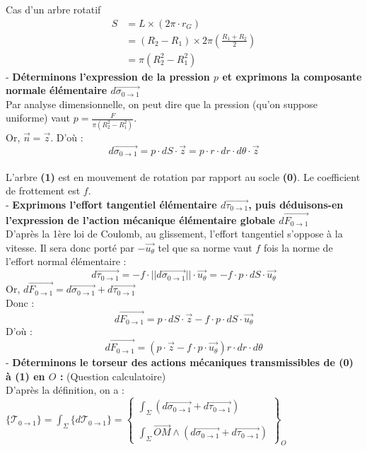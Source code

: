 \documentclass{article} %
\begin{document}
{\begin{exemple}{Cas d'un arbre rotatif}
\begin{align*}
S &= L \times (2\pi \cdot r_G)\\
&= (R_2 - R_1) \times 2\pi \left(\frac{R_1 + R_2}{2}\right)\\
&= \pi(R_2^2 - R_1^2)
\end{align*}
- \textbf{Déterminons l'expression de la pression $p$ et exprimons la composante normale élémentaire  $d\overrightarrow{\sigma_{0\to 1}}$}\\
Par analyse dimensionnelle, on peut dire que la pression (qu'on suppose uniforme) vaut $p = \frac{F}{\pi(R_2^2 - R_1^2)}$.\\
Or, $\vec{n} = \vec{z}$. D'où :
$$d\overrightarrow{\sigma_{0\to 1}} = p \cdot dS \cdot \vec{z} = p \cdot r \cdot dr \cdot d\theta \cdot \vec{z}$$\\
L'arbre \textbf{(1)} est en mouvement de rotation par rapport au socle \textbf{(0)}. Le coefficient de frottement est $f$.\\
- \textbf{Exprimons l'effort tangentiel élémentaire $d\overrightarrow{\tau_{0\to 1}}$, puis déduisons-en l'expression de l'action mécanique élémentaire globale $d\overrightarrow{F_{0\to 1}}$}\\
D'après la 1ère loi de Coulomb, au glissement, l'effort tangentiel s'oppose à la vitesse. Il sera donc porté par $-\overrightarrow{u_\theta}$ tel que sa norme vaut $f$ fois la norme de l'effort normal élémentaire :
$$d\overrightarrow{\tau_{0\to 1}} = - f \cdot ||d\overrightarrow{\sigma_{0\to 1}}|| \cdot \vec{u_\theta} = - f \cdot p \cdot dS \cdot \vec{u_\theta}$$
Or, $d\overrightarrow{F_{0\to 1}} = d\overrightarrow{\sigma_{0\to 1}} + d\overrightarrow{\tau_{0\to 1}}$\\
Donc : 
$$d\overrightarrow{F_{0\to 1}} = p \cdot dS \cdot \vec{z} - f \cdot p \cdot dS \cdot \vec{u_\theta}$$
D'où :
$$d\overrightarrow{F_{0\to 1}} = \left( p \cdot \vec{z} - f \cdot p \cdot \vec{u_\theta} \right) r \cdot dr \cdot d\theta$$
- \textbf{Déterminons le torseur des actions mécaniques transmissibles de \textbf{(0)} à \textbf{(1)} en $O$ :} \hfill (Question calculatoire)\\
D'après la définition, on a : $\displaystyle \{\mathcal{T}_{0\to 1}\} = \int_{\Sigma} \{d\mathcal{T}_{0\to 1}\} = \begin{Bmatrix} \displaystyle \int_{\Sigma} \left( d\overrightarrow{\sigma_{0\to 1}} + d\overrightarrow{\tau_{0\to 1}} \right) \\ \\ \displaystyle \int_{\Sigma} \overrightarrow{OM} \wedge \left( d\overrightarrow{\sigma_{0\to 1}} + d\overrightarrow{\tau_{0\to 1}} \right) \end{Bmatrix}_{O}$\\

\end{exemple}}
\end{document}
